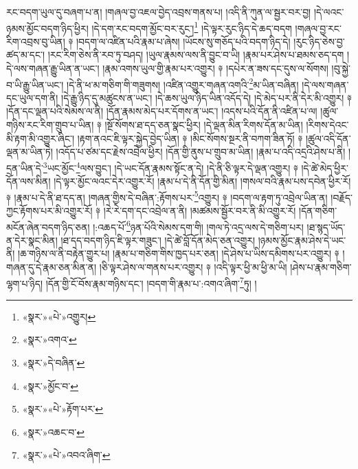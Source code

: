 རང་བདག་ཡུལ་དུ་བཞག་པ་ན། །གཞལ་བྱ་འཇལ་བྱེད་འབྲས་གནས་པ། །འདི་ནི་ཀུན་ལ་སྦྱར་བར་བྱ། །དེ་ལའང་ཉམས་མྱོང་བདག་ཉིད་ཕྱིར། །དེ་དག་རང་བདག་མྱོང་བར་རུང་།\footnote{«སྣར་»«པེ་»འགྱུར།} །དེ་ལྟར་རུང་ཉིད་དེ་ཆད་བདག །གཞལ་བྱ་རང་རིག་འབྲས་བུ་ཡིན། ༈ །བདག་ལ་འཛིན་པའི་རྣམ་པ་ཞེས། །ཡོངས་སུ་གཅོད་པའི་བདག་ཉིད་དེ། །རུང་ཉིད་ཅེས་བྱ་ཚད་མ་དང་། །རང་རིག་ཅེས་ནི་རབ་ཏུ་བཤད། །ཡུལ་རྣམས་ལས་ནི་བྱུང་བ་ཡི། །རྣམ་པར་ཤེས་པ་ཐམས་ཅད་དག །དེ་ལས་གཞན་རྒྱུ་ཡིན་ན་ཡང་། །རྣམ་འགས་ཡུལ་གྱི་རྣམ་པར་འགྱུར། ༈ །དཔེར་ན་ཟས་དང་དུས་ལ་སོགས། །བུ་སྐྱེ་བ་ཡི་རྒྱུ་ཡིན་ཡང་། །དེ་ནི་ཕ་མ་གཅིག་གི་གཟུགས། །འཛིན་འགྱུར་གཞན་འགའི་\footnote{«སྣར་»འགའ་}མ་ཡིན་བཞིན། །དེ་ལས་གཞན་དང་ཡུལ་དག་ནི། །དེ་རྒྱུ་ཉིད་དུ་མཚུངས་ན་ཡང་། །དེ་ཆས་ཡུལ་ཉིད་ཡིན་འདོད་དེ། །དེ་མེད་པར་ནི་དེར་མི་འགྱུར། ༈ །དོན་དང་ལྡན་པའི་སེམས་ལ་ནི། །དོན་རྣམས་མེད་པར་དོགས་ན་ཡང་། །འདས་པའི་དོན་ནི་འཛིན་པ་ལ། །ཚུལ་གཉིས་རང་རིག་གྲུབ་པ་ཡིན། ༈ །སྔོ་སོགས་ཐ་དད་ཅན་སྣང་ཕྱིར། །དེ་ལྡན་མིན་རིགས་དོན་མ་ཡིན། །རིགས་དེའང་མི་རྟག་མི་འགྱུར་ཞིང་། །རྟག་ནའང་ཇི་ལྟར་སྐྱེད་བྱེད་ཡིན། ༈ །མིང་སོགས་སྔར་ནི་བཀག་ཟིན་ཏོ། ༈ །ཚུལ་འདི་དོན་ལྡན་མ་ཡིན་ཏེ། །འདོད་པ་ཙམ་དང་རྗེས་འབྲེལ་ཕྱིར། །དོན་གྱི་ནུས་པ་གྲུབ་མ་ཡིན། །རྣམ་པ་འདི་འདྲའི་ཤེས་པ་ནི། །དྲན་ཡིན་དེ་\footnote{«སྣར་»དེ་བཞིན་}ཡང་མྱོང་\footnote{«སྣར་»མྱོང་བ་}ལས་བྱུང་། །དེ་ཡང་དོན་རྣམས་སྟོང་ན་དེ། །དེ་ནི་ཅི་ལྟར་དེ་ལྡན་འགྱུར། ༈ །དེ་ཚེ་མེད་ཕྱིར་དོན་ལས་མིན། །དེ་ལྟར་མྱོང་ལའང་དེར་འགྱུར་རོ། །རྣམ་པ་དེ་ནི་དོན་གྱི་མིན། །གསལ་བའི་རྣམ་པས་དབེན་ཕྱིར་རོ། ༈ །རྣམ་པ་དེ་ནི་ཐ་དད་ན། །གཞན་གྱིས་དེ་བཞིན་:རྟོགས་པར་\footnote{«སྣར་»«པེ་»རྟོག་པར་}འགྱུར། ༈ །བདག་ལ་རྟག་ཏུ་འབྲེལ་ཡིན་ན། །བརྗོད་ཀྱང་རྟོགས་པར་མི་འགྱུར་རོ། ༈ །རེ་རེ་དག་དང་འབྲེལ་ན་ནི། །མཚམས་སྦྱོར་བར་ནི་མི་འགྱུར་རོ། །དོན་གཅིག་མངོན་ཞེན་བདག་ཉིད་ཅན། །:འཆད་པོ་\footnote{«སྣར་»འཆང་བ་}ཉན་པོའི་སེམས་དག་གི། །གལ་ཏེ་འདྲ་ལས་དེ་གཅིག་པར། །ཐ་སྙད་ཡོད་ན་དེར་སྣང་མིན། །ཐ་དད་བདག་ཉིད་ཇི་ལྟར་གཟུང་། །དེ་ཚེ་བློ་དོན་མེད་ཅན་འགྱུར། །ཉམས་མྱོང་རྣམ་ཤེས་དེ་ཡང་ནི། །ཆ་གཉིས་ལ་ནི་བརྟེན་གྱུར་པ། །རྣམ་པ་གཅིག་གིས་ཁྱད་པར་ཅན། །དེ་ཤེས་པ་ཡིས་དམིགས་པར་འགྱུར། ༈ །གཞན་དུ་དེ་རྣམ་ཅན་མིན་ན། །ཅི་ལྟར་ཤེས་ལ་གནས་པར་འགྱུར། ༈ །འདི་ལྟར་ཕྱི་མ་ཕྱི་མ་ཡི། །ཤེས་པ་རྣམ་གཅིག་ལྷག་པ་ཉིད། །དོན་གྱི་ངོ་བོས་རྣམ་གཉིས་དང་། །བདག་གི་རྣམ་པ་:འགའ་ཞིག་\footnote{«སྣར་»«པེ་»འབའ་ཞིག་}ཏུ། །
